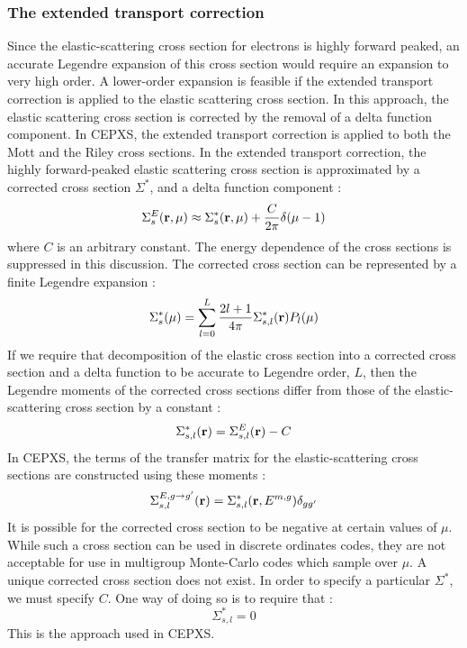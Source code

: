 \subsubsection{The extended transport correction}
Since the elastic-scattering cross section for electrons is highly forward
peaked, an accurate Legendre expansion of this cross section would require an
expansion to very high order. A lower-order expansion is feasible if the
extended transport correction is applied to the elastic scattering cross
section. In this approach, the elastic scattering cross section is corrected
by the removal of a delta function component. In CEPXS, the extended transport
correction is applied to both the Mott and the Riley cross sections. In the
extended transport correction, the highly forward-peaked elastic scattering
cross section is approximated by a corrected cross section $\Sigma^*$, and a
delta function component :
\begin{equation}
\Sigma_s^E(\mathbf{r},\mu) \approx \Sigma_s^*(\mathbf{r},\mu) + \frac{C}{2\pi} \delta (\mu-1)
\end{equation}
where $C$ is an arbitrary constant. The energy dependence of the cross
sections is suppressed in this discussion. The corrected cross section can be
represented by a finite Legendre expansion :
\begin{equation}
\Sigma_s^*(\mu) = \sum_{l=0}^{L} \frac{2l+1}{4 \pi} \Sigma_{s,l}^*(\mathbf{r})
P_l(\mu)
\end{equation}
If we require that decomposition of the elastic cross section into a corrected
cross section and a delta function to be accurate to Legendre order, $L$, then
the Legendre moments of the corrected cross sections differ from those of the
elastic-scattering cross section by a constant :
\begin{equation}
\Sigma_{s,l}^*(\mathbf{r}) = \Sigma_{s,l}^E(\mathbf{r})- C
\end{equation}
In CEPXS, the terms of the transfer matrix for the elastic-scattering cross
sections are constructed using these moments :
\begin{equation}
\Sigma_{s,l}^{E,g\rightarrow g'}(\mathbf{r}) =
\Sigma_{s,l}^{*}(\mathbf{r},E^{m,g})\delta_{gg'}
\end{equation}
It is possible for the corrected cross section to be negative at certain
values of $\mu$. While such a cross section can be used in discrete ordinates
codes, they are not acceptable for use in multigroup Monte-Carlo codes which
sample over $\mu$. A unique corrected cross section does not exist. In order
to specify a particular $\Sigma^*$, we must specify $C$. One way of doing so
is to require that :
\begin{equation}
\Sigma_{s,l}^* =0
\end{equation}
This is the approach used in CEPXS.


